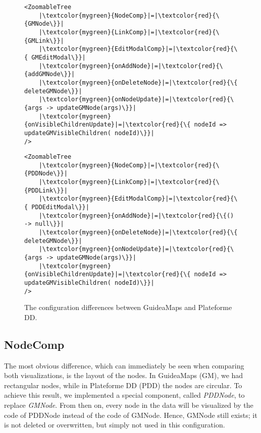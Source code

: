 \begin{figure}[H]
	\begin{minipage}{0.5\textwidth}
 		 \centering
		 \begin{verbatim}
<ZoomableTree
    |\textcolor{mygreen}{NodeComp}|=|\textcolor{red}{\{GMNode\}}|
    |\textcolor{mygreen}{LinkComp}|=|\textcolor{red}{\{GMLink\}}|
    |\textcolor{mygreen}{EditModalComp}|=|\textcolor{red}{\{ GMEditModal\}}|
    |\textcolor{mygreen}{onAddNode}|=|\textcolor{red}{\{addGMNode\}}|
    |\textcolor{mygreen}{onDeleteNode}|=|\textcolor{red}{\{ deleteGMNode\}}|
    |\textcolor{mygreen}{onNodeUpdate}|=|\textcolor{red}{\{args -> updateGMNode(args)\}}|
    |\textcolor{mygreen}{onVisibleChildrenUpdate}|=|\textcolor{red}{\{ nodeId => updateGMVisibleChildren( nodeId)\}}|
/>
		\end{verbatim}
		\label{lst:default-components}
	\end{minipage}
 	\begin{minipage}{0.5\textwidth}
  		\centering
  		\begin{verbatim}
<ZoomableTree
    |\textcolor{mygreen}{NodeComp}|=|\textcolor{red}{\{PDDNode\}}|
    |\textcolor{mygreen}{LinkComp}|=|\textcolor{red}{\{PDDLink\}}|
    |\textcolor{mygreen}{EditModalComp}|=|\textcolor{red}{\{ PDDEditModal\}}|
    |\textcolor{mygreen}{onAddNode}|=|\textcolor{red}{\{() -> null\}}|
    |\textcolor{mygreen}{onDeleteNode}|=|\textcolor{red}{\{ deleteGMNode\}}|
    |\textcolor{mygreen}{onNodeUpdate}|=|\textcolor{red}{\{args -> updateGMNode(args)\}}|
    |\textcolor{mygreen}{onVisibleChildrenUpdate}|=|\textcolor{red}{\{ nodeId => updateGMVisibleChildren( nodeId)\}}|
/>
		\end{verbatim}
		\label{lst:custom-components}
 	\end{minipage}
	\caption{The configuration differences between GuideaMaps and Plateforme DD.}
	\label{fig:differences-gm-vs-pdd}
\end{figure}

\subsection{NodeComp}\label{sec:usecase-nodecomp}
The most obvious difference, which can immediately be seen when comparing both visualizations, is the layout of the nodes. In GuideaMaps (GM), we had rectangular nodes, while in Plateforme DD (PDD) the nodes are circular. To achieve this result, we implemented a special component, called \textit{PDDNode}, to replace \textit{GMNode}. From then on, every node in the data will be visualized by the code of PDDNode instead of the code of GMNode. Hence, GMNode still exists; it is not deleted or overwritten, but simply not used in this configuration.



